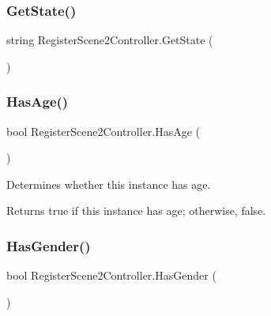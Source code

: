 \subsubsection{\texorpdfstring{Get\+State()}{GetState()}}
{\footnotesize\ttfamily string Register\+Scene2\+Controller.\+Get\+State (\begin{DoxyParamCaption}{ }\end{DoxyParamCaption})\hspace{0.3cm}{\ttfamily [inline]}}

\mbox{\label{classRegisterScene2Controller_ac4411a55424921687efa4e6823ee0873}} 
\subsubsection{\texorpdfstring{Has\+Age()}{HasAge()}}
{\footnotesize\ttfamily bool Register\+Scene2\+Controller.\+Has\+Age (\begin{DoxyParamCaption}{ }\end{DoxyParamCaption})\hspace{0.3cm}{\ttfamily [inline]}}



Determines whether this instance has age. 

\begin{DoxyReturn}{Returns}
{\ttfamily true} if this instance has age; otherwise, {\ttfamily false}.
\end{DoxyReturn}
\mbox{\label{classRegisterScene2Controller_a1e1e22096293701416e0c2b471e22284}} 
\subsubsection{\texorpdfstring{Has\+Gender()}{HasGender()}}
{\footnotesize\ttfamily bool Register\+Scene2\+Controller.\+Has\+Gender (\begin{DoxyParamCaption}{ }\end{DoxyParamCaption})\hspace{0.3cm}{\ttfamily [inline]}}



